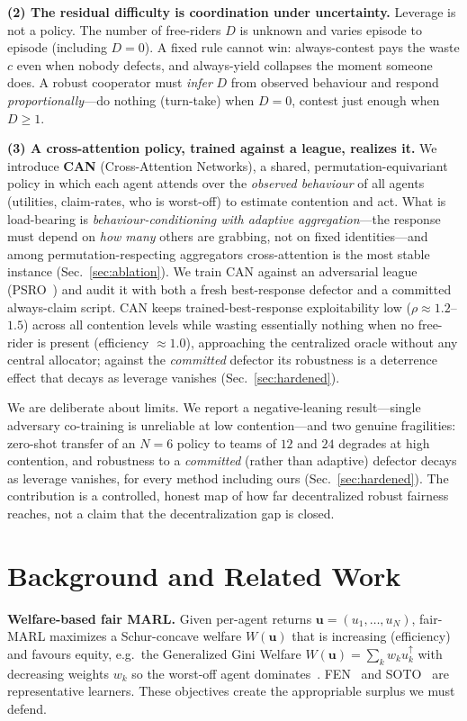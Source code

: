 \documentclass[conference, a4paper]{IEEEtran}
\begin{document}
\textbf{(2) The residual difficulty is coordination under uncertainty.} Leverage is
not a policy. The number of free-riders $D$ is unknown and varies episode to
episode (including $D{=}0$). A fixed rule cannot win: always-contest pays the
waste $c$ even when nobody defects, and always-yield collapses the moment someone
does. A robust cooperator must \emph{infer} $D$ from observed behaviour and respond
\emph{proportionally}---do nothing (turn-take) when $D{=}0$, contest just enough
when $D\ge 1$.

\textbf{(3) A cross-attention policy, trained against a league, realizes it.} We
introduce \textbf{CAN} (Cross-Attention Networks), a shared,
permutation-equivariant policy in which each agent attends over the \emph{observed
behaviour} of all agents (utilities, claim-rates, who is worst-off) to estimate
contention and act. What is load-bearing is \emph{behaviour-conditioning with
adaptive aggregation}---the response must depend on \emph{how many} others are
grabbing, not on fixed identities---and among permutation-respecting aggregators
cross-attention is the most stable instance (Sec.~\ref{sec:ablation}). We train
CAN against an adversarial league (PSRO~\cite{lanctot2017psro}) and audit it with
both a fresh best-response defector and a committed always-claim script. CAN keeps
trained-best-response exploitability low ($\rho{\approx}1.2$--$1.5$) across all
contention levels while wasting essentially nothing when no free-rider is present
(efficiency ${\approx}1.0$), approaching the centralized oracle without any central
allocator; against the \emph{committed} defector its robustness is a deterrence
effect that decays as leverage vanishes (Sec.~\ref{sec:hardened}).

We are deliberate about limits. We report a negative-leaning result---single
adversary co-training is unreliable at low contention---and two genuine
fragilities: zero-shot transfer of an $N{=}6$ policy to teams of $12$ and $24$
degrades at high contention, and robustness to a \emph{committed} (rather than
adaptive) defector decays as leverage vanishes, for every method including ours
(Sec.~\ref{sec:hardened}). The contribution is a controlled,
honest map of how far decentralized robust fairness reaches, not a claim that the
decentralization gap is closed.

\section{Background and Related Work}
\textbf{Welfare-based fair MARL.} Given per-agent returns
$\mathbf{u}=(u_1,\dots,u_N)$, fair-MARL maximizes a Schur-concave welfare
$W(\mathbf{u})$ that is increasing (efficiency) and favours equity, e.g.\ the
Generalized Gini Welfare $W(\mathbf{u})=\sum_k w_k u^{\uparrow}_k$ with decreasing
weights $w_k$ so the worst-off agent dominates~\cite{siddique2020ggf}.
FEN~\cite{jiang2019fen} and SOTO~\cite{zimmer2021soto} are representative learners.
These objectives create the appropriable surplus we must defend.
\end{document}
